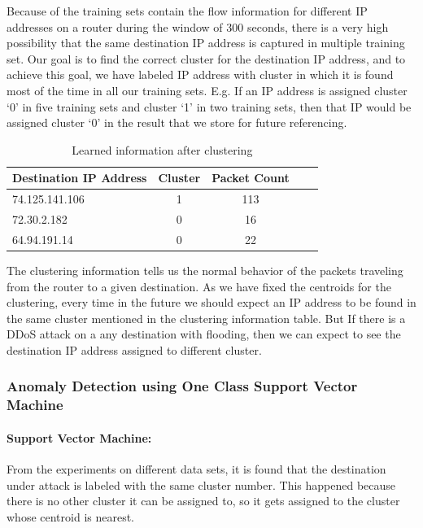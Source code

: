 \documentclass[12pt,oneside,a4paper]{article}
\begin{document}
Because of the training sets contain the flow information for different IP addresses on a router during the window of 300 seconds, there is a very high possibility that the same destination IP address is captured in multiple training set. Our goal is to find the correct cluster for the destination IP address, and to achieve this goal, we have labeled IP address with cluster in which it is found most of the time in all our training sets. E.g. If an IP address is assigned cluster `0' in five training sets and cluster `1' in two training sets, then that IP would be assigned cluster `0' in the result that we store for future referencing.

\begin{table}[H]
\centering
  \begin{tabular}{| l | c | c | c | c |}
    \hline
    {Destination IP Address}  &Cluster  &Packet Count \\
    \hline
    74.125.141.106  & 1     & 113  \\ \hline
    72.30.2.182     & 0     & 16   \\ \hline
    64.94.191.14    & 0     & 22   \\ \hline
  \end{tabular}
\caption{Learned information after clustering} \label{table:learned-clustering}
\end{table}

The clustering information tells us the normal behavior of the packets traveling from the router to a given destination. As we have fixed the centroids for the clustering, every time in the future we should expect an IP address to be found in the same cluster mentioned in the clustering information table. But If there is a DDoS attack on a any destination with flooding, then we can expect to see the destination IP address assigned to different cluster.

\subsubsection{Anomaly Detection using One Class Support Vector Machine} \label{subsec:Anomaly_Detection}

\paragraph{Support Vector Machine:}

From the experiments on different data sets, it is found that the destination under attack is labeled with the same cluster number. This happened because there is no other cluster it can be assigned to, so it gets assigned to the cluster whose centroid is nearest.
\end{document}
